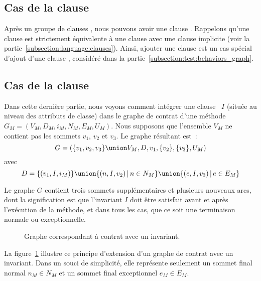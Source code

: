 \subsection{Cas de la clause \adefault}
\label{subsection:test:default_graph}

Après un groupe de clauses \abehavior, nous pouvons avoir une clause \adefault.
Rappelons qu'une clause \adefault est strictement équivalente à une clause
\abehavior avec une clause \arequires implicite (voir la
partie~\ref{subsection:language:clauses}). Ainsi, ajouter une clause \adefault
est un cas spécial d'ajout d'une clause \abehavior, considéré dans la
partie~\ref{subsection:test:behaviors_graph}.

\subsection{Cas de la clause \ainvariant}
\label{subsection:test:invariant_graph}

Dans cette dernière partie, nous voyons comment intégrer une clause
\ainvariant~$I$ (située au niveau des attributs de classe) dans le graphe de
contrat d'une méthode $G_M = (V_M, D_M, i_M, N_M, E_M, U_M)$. Nous supposons que
l'ensemble $V_M$ ne contient pas les sommets $v_1$, $v_2$ et $v_3$. Le graphe
résultant est~:
%
$$G = (
  \{v_1, v_2, v_3\} \union V_M,
  D,
  v_1,
  \{v_2\},
  \{v_3\},
  U_M
)$$
%
avec
%
$$D = \{(v_1, I, i_M)\} \union
      \{(n, I, v_2) \,\vert\, n \in N_M\} \union
      \{(e, I, v_3) \,\vert\, e \in E_M\}$$

Le graphe $G$ contient trois sommets supplémentaires et plusieurs nouveaux arcs,
dont la signification est que l'invariant $I$ doit être satisfait avant et après
l'exécution de la méthode, et dans tous les cas, que ce soit une terminaison
normale ou exceptionnelle.

\begin{figure}


\caption{\label{figure:test:invariant_graph} Graphe correspondant à contrat avec
un invariant.}

\end{figure}

\begin{example}

La figure~\ref{figure:test:invariant_graph} illustre ce principe d'extension
d'un graphe de contrat avec un invariant. Dans un souci de simplicité, elle
représente seulement un sommet final normal $n_M \in N_M$ et un sommet final
exceptionnel $e_M \in E_M$.

\end{example}
